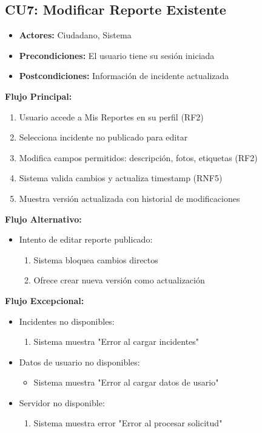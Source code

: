 \begin{multicols}{2}
\subsection*{CU7: Modificar Reporte Existente}
\begin{itemize}
    \item \textbf{Actores:} Ciudadano, Sistema
    \item \textbf{Precondiciones:} El usuario tiene su sesión iniciada
    \item \textbf{Postcondiciones:} Información de incidente actualizada 
\end{itemize}
\textbf{Flujo Principal:}
\begin{enumerate}
    \item Usuario accede a Mis Reportes en su perfil (RF2)
    \item Selecciona incidente no publicado para editar
    \item Modifica campos permitidos: descripción, fotos, etiquetas (RF2)
    \item Sistema valida cambios y actualiza timestamp (RNF5)
    \item Muestra versión actualizada con historial de modificaciones
\end{enumerate}

\textbf{Flujo Alternativo:}
\begin{itemize}
    \item Intento de editar reporte publicado:
    \begin{enumerate}
        \item Sistema bloquea cambios directos
        \item Ofrece crear nueva versión como actualización
    \end{enumerate}
\end{itemize}

\textbf{Flujo Excepcional:}
\begin{itemize}
    \item Incidentes no disponibles:
    \begin{enumerate}
        \item Sistema muestra "Error al cargar incidentes"
    \end{enumerate}
    \item Datos de usuario no disponibles:
    \begin{itemize}
        \item Sistema muestra "Error al cargar datos de usario"
    \end{itemize}
    \item Servidor no disponible:
    \begin{enumerate}
        \item Sistema muestra error "Error al procesar solicitud"
    \end{enumerate}
\end{itemize}


\end{multicols}
